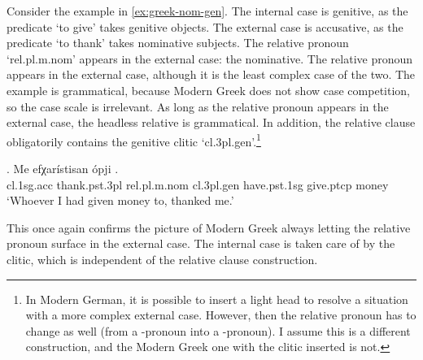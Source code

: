 Consider the example in \ref{ex:greek-nom-gen}.
The internal case is genitive, as the predicate  `to give' takes genitive objects.
The external case is accusative, as the predicate  `to thank' takes nominative subjects.
The relative pronoun  `\ac{rel}.\ac{pl}.\ac{m}.\ac{nom}' appears in the external case: the nominative.
The relative pronoun appears in the external case, although it is the least complex case of the two. The example is grammatical, because Modern Greek does not show case competition, so the case scale is irrelevant. As long as the relative pronoun appears in the external case, the headless relative is grammatical. In addition, the relative clause obligatorily contains the genitive clitic  `\ac{cl}.3\ac{pl}.\ac{gen}'.\footnote{
In Modern German, it is possible to insert a light head to resolve a situation with a more complex external case. However, then the relative pronoun has to change as well (from a -pronoun into a -pronoun). I assume this is a different construction, and the Modern Greek one with the clitic inserted is not.
}

\exg. Me efχarístisan ópji    .\\
 \ac{cl}.1\ac{sg}.\ac{acc} thank.\ac{pst}.3\ac{pl}\scsub{[nom]} \ac{rel}.\ac{pl}.\ac{m}.\ac{nom} \ac{cl}.3\ac{pl}.\ac{gen} have.\ac{pst}.1\ac{sg} give.\ac{ptcp}\scsub{[gen]} money\\
 `Whoever I had given money to, thanked me.'\label{ex:greek-nom-gen}

This once again confirms the picture of Modern Greek always letting the relative pronoun surface in the external case. The internal case is taken care of by the clitic, which is independent of the relative clause construction.

